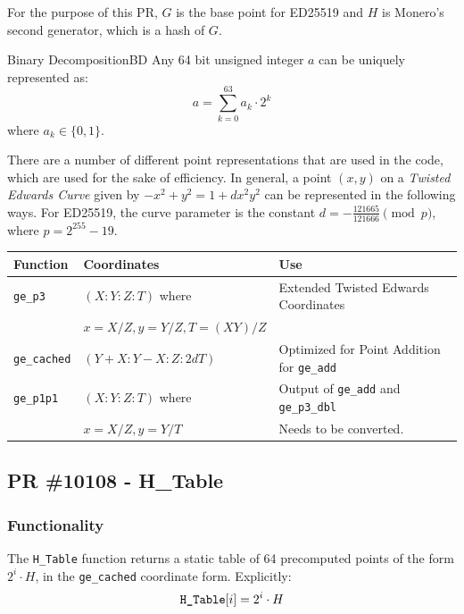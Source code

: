 \documentclass[12pt,titlepage,table]{article}
\begin{document}
For the purpose of this PR, $G$ is the base point for ED25519 and $H$ is Monero's second generator, which is a hash of $G$.

\medskip
\begin{df}{Binary Decomposition}{BD}
Any 64 bit unsigned integer $a$ can be uniquely represented as:
$$a = \sum_{k =0}^{63} a_k \cdot 2^k$$
where $a_k \in \{0,1\}$.
\end{df}

\medskip
There are a number of different point representations that are used in the code, which are used for the sake of efficiency. In general, a point $(x,y)$ on a \textit{Twisted Edwards Curve} given by $-x^2 + y^2 = 1 + dx^2y^2$ can be represented in the following ways. For ED25519, the curve parameter is the constant $d = -\frac{121665}{121666} \pmod p$, where $p = 2^{255} - 19$.

\begin{table}[htbp]
\centering
{
\begin{tabular}{| l | l | l|}
\hline
\textbf{Function} & \textbf{Coordinates} & \textbf{Use} \\
\hline
\hline
\verb|ge_p3| & $(X: Y: Z: T)$ where & Extended Twisted Edwards Coordinates \\
& $x = X/Z, y = Y/Z, T = (XY)/Z$ & \\
\hline
\verb|ge_cached| & $(Y + X: Y - X: Z: 2dT)$ & Optimized for Point Addition for \verb|ge_add| \\
\hline
\verb|ge_p1p1| & $(X: Y: Z: T)$ where & Output of \verb|ge_add| and \verb|ge_p3_dbl| \\
& $x = X/Z, y = Y/T$ & Needs to be converted.\\
\hline
\end{tabular}}
\end{table}

\subsection{PR \#10108 - H\_Table}
\subsubsection{Functionality}
\indent \indent The \verb|H_Table| function returns a static table of 64 precomputed points of the form $2^i \cdot H$, in the  \verb|ge_cached| coordinate form. Explicitly:
$$\verb|H_Table|[i] = 2^i \cdot H$$


\end{document}
